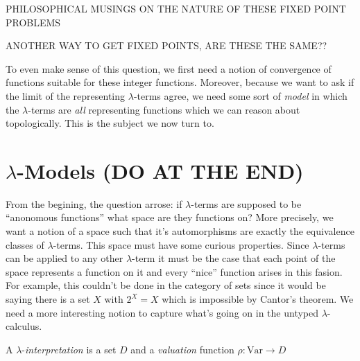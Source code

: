 \documentclass[12pt]{article}
\begin{document}
PHILOSOPHICAL MUSINGS ON THE NATURE OF THESE FIXED POINT PROBLEMS


ANOTHER WAY TO GET FIXED POINTS, ARE THESE THE SAME??

To even make sense of this question, we first need a notion of convergence of functions suitable for these integer functions. Moreover, because we want to ask if the limit of the representing $\lambda$-terms agree, we need some sort of \textit{model} in which the $\lambda$-terms are \textit{all} representing functions which we can reason about topologically. This is the subject we now turn to. 

\section{$\lambda$-Models (DO AT THE END)}

From the begining, the question arrose: if $\lambda$-terms are supposed to be ``anonomous functions'' what space are they functions on? More precisely, we want a notion of a space such that it's automorphisms are exactly the equivalence classes of $\lambda$-terms. This space must have some curious properties. Since $\lambda$-terms can be applied to any other $\lambda$-term it must be the case that each point of the space represents a function on it and every ``nice'' function arises in this fasion. For example, this couldn't be done in the category of sets since it would be saying there is a set $X$ with $2^X = X$ which is impossible by Cantor's theorem. We need a more interesting notion to capture what's going on in the untyped $\lambda$-calculus. 

\newcommand{\Var}{\mathrm{Var}}

\begin{defn}
A $\lambda$-\textit{interpretation} is a set $D$ and a \textit{valuation} function $\rho : \Var \to D$
\end{defn}
\end{document}
